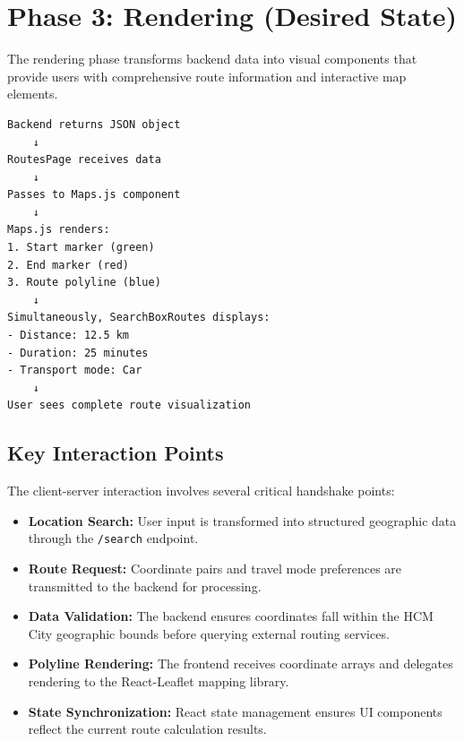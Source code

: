 \section{Phase 3: Rendering (Desired State)}

The rendering phase transforms backend data into visual components that provide users with comprehensive route information and interactive map elements.

\begin{tcolorbox}[colback=gray!10,colframe=black!50,arc=2mm,title=Rendering Flow]
\begin{verbatim}
Backend returns JSON object
    ↓
RoutesPage receives data
    ↓
Passes to Maps.js component
    ↓
Maps.js renders:
1. Start marker (green)
2. End marker (red)
3. Route polyline (blue)
    ↓
Simultaneously, SearchBoxRoutes displays:
- Distance: 12.5 km
- Duration: 25 minutes
- Transport mode: Car
    ↓
User sees complete route visualization
\end{verbatim}
\end{tcolorbox}

\subsection{Key Interaction Points}

The client-server interaction involves several critical handshake points:

\begin{itemize}
    \item \textbf{Location Search:} User input is transformed into structured geographic data through the \texttt{/search} endpoint.
    \item \textbf{Route Request:} Coordinate pairs and travel mode preferences are transmitted to the backend for processing.
    \item \textbf{Data Validation:} The backend ensures coordinates fall within the HCM City geographic bounds before querying external routing services.
    \item \textbf{Polyline Rendering:} The frontend receives coordinate arrays and delegates rendering to the React-Leaflet mapping library.
    \item \textbf{State Synchronization:} React state management ensures UI components reflect the current route calculation results.
\end{itemize}
